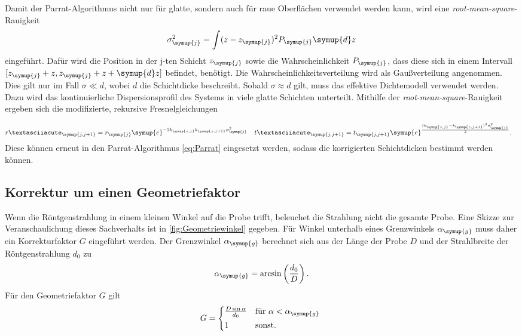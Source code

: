 Damit der Parrat-Algorithmus nicht nur für glatte, sondern auch für raue Oberflächen verwendet werden kann, wird eine \textit{root-mean-square}-Rauigkeit 
\begin{equation*}
    \sigma_{\symup{j}}^2 = \int (z-z_{\symup{j}})^2 P_{\symup{j}}\symup{d}z
\end{equation*}
eingeführt. Dafür wird die Position in der j-ten Schicht $z_{\symup{j}}$ sowie die Wahrscheinlichkeit $P_{\symup{j}}$, dass diese sich in einem Intervall 
$[z_{\symup{j}}+z, z_{\symup{j}}+z+\symup{d}z]$ befindet, benötigt. Die Wahrscheinlichkeitsverteilung wird als Gaußverteilung angenommen.
Dies gilt nur im Fall $\sigma \ll d$, wobei $d$ die Schichtdicke beschreibt. Sobald $\sigma \approx d$ gilt, muss das effektive Dichtemodell verwendet werden.
Dazu wird das kontinuierliche Dispersionsprofil des Systems in viele glatte Schichten unterteilt.
Mithilfe der \textit{root-mean-square}-Rauigkeit ergeben sich die modifizierte, rekursive Fresnelgleichungen

\begin{align}
    \label{eqn:r_korrigiert}
    r´_{\symup{j,j+1}} &= r_{\symup{j}}\symup{e}^{-2k_{\symup{z,j}}k_{\symup{z,j+1}}\sigma_{\symup{j}}^2} & t´_{\symup{j,j+1}} &= t_{\symup{j,j+1}}\symup{e}^{\frac{(k_{\symup{z,j}}-k_{\symup{z,j+1}})^2\sigma_{\symup{j}}^2}{2}}.
\end{align}
Diese können erneut in den Parrat-Algorithmus \eqref{eq:Parrat} eingesetzt werden, sodass die korrigierten Schichtdicken bestimmt werden können.

\subsection{Korrektur um einen Geometriefaktor}
Wenn die Röntgenstrahlung in einem kleinen Winkel auf die Probe trifft, beleuchet die Strahlung nicht die gesamte Probe. Eine Skizze zur Veranschaulichung dieses Sachverhalts ist in
\autoref{fig:Geometriewinkel} gegeben. Für Winkel unterhalb eines Grenzwinkels $\alpha_{\symup{g}}$ muss daher ein Korrekturfaktor $G$ eingeführt werden.
Der Grenzwinkel $\alpha_{\symup{g}}$ berechnet sich aus der Länge der Probe $D$ und der Strahlbreite der Röntgenstrahlung $d_0$ zu
\begin{equation}
    \label{eqn:a_g}
    \alpha_{\symup{g}} = \arcsin \left(\frac{d_0}{D}\right).
\end{equation}
Für den Geometriefaktor $G$ gilt
\begin{equation}
    G = 
    \begin{cases*}
        \frac{D\sin \alpha}{d_0}  & für $\alpha < \alpha_{\symup{g}}$ \\
        1 & sonst.
    \end{cases*}
    \label{eq:Geometriefaktor}
\end{equation}

